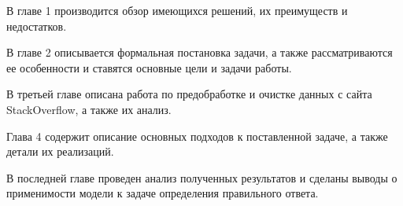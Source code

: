 \documentclass[../diploma.tex]{subfiles}
\begin{document}
                                                       
	В главе 1 производится обзор имеющихся решений, их преимуществ и недостатков.

	В главе 2 описывается формальная постановка задачи, а также рассматриваются ее особенности и ставятся основные цели и задачи работы.

	В третьей главе описана работа по предобработке и очистке данных с сайта StackOverflow, а также их анализ.

	Глава 4 содержит описание основных подходов к поставленной задаче, а также детали их реализаций.

	В последней главе проведен анализ полученных результатов и сделаны выводы о применимости модели к задаче определения правильного ответа.
                                                       
\end{document}
